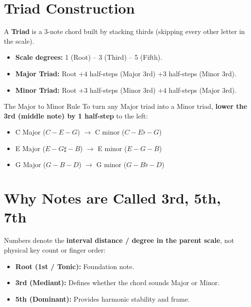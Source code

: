 
\section{Triad Construction}

A \textbf{Triad} is a 3-note chord built by stacking thirds (skipping every other letter in the scale).

\begin{itemize}
    \item \textbf{Scale degrees:} 1 (Root) -- 3 (Third) -- 5 (Fifth).
    \item \textbf{Major Triad:} Root $+ 4$ half-steps (Major 3rd) $+ 3$ half-steps (Minor 3rd).
    \item \textbf{Minor Triad:} Root $+ 3$ half-steps (Minor 3rd) $+ 4$ half-steps (Major 3rd).
\end{itemize}

\begin{examplebox}{The Major to Minor Rule}
To turn any Major triad into a Minor triad, \textbf{lower the 3rd (middle note) by 1 half-step} to the left:
\begin{itemize}
    \item C Major ($C - E - G$) $\longrightarrow$ C minor ($C - E\flat - G$)
    \item E Major ($E - G\sharp - B$) $\longrightarrow$ E minor ($E - G - B$)
    \item G Major ($G - B - D$) $\longrightarrow$ G minor ($G - B\flat - D$)
\end{itemize}
\end{examplebox}

\section{Why Notes are Called 3rd, 5th, 7th}

Numbers denote the \textbf{interval distance / degree in the parent scale}, not physical key count or finger order:
\begin{itemize}
    \item \textbf{Root (1st / Tonic):} Foundation note.
    \item \textbf{3rd (Mediant):} Defines whether the chord sounds Major or Minor.
    \item \textbf{5th (Dominant):} Provides harmonic stability and frame.
\end{itemize}

